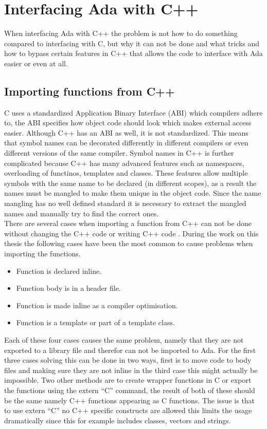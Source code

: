 \chapter{Interfacing Ada with C++}
When interfacing Ada with C++ the problem is not how to do something compared to interfacing with C, but why it can not be done and what tricks and how to bypass certain features in C++ that allows the code to interface with Ada easier or even at all.
\section{Importing functions from C++}
C uses a standardized Application Binary Interface (ABI) which compilers adhere to, the ABI specifies how object code should look which makes external access easier. Although C++ has an ABI as well, it is not standardized. This means that symbol names can be decorated differently in different compilers or even different versions of the same compiler. Symbol names in C++ is further complicated because C++ has many advanced features such as namespaces, overloading of functinos, templates and classes. These features allow multiple symbols with the same name to be declared (in different scopes), as a result the names must be mangled to make them unique in the object code. Since the name mangling has no well defined standard it is necessary to extract the mangled names and manually try to find the correct ones.
\\
There are several cases when importing a function from C++ can not be done without changing the C++ code or writing C++ code \cite{gccinterface}. During the work on this thesis the following cases have been the most common to cause problems when importing the functions.
\begin{itemize}
\item Function is declared inline.
\item Function body is in a header file.
\item Function is made inline as a compiler optimisation.
\item Function is a template or part of a template class.
\end{itemize}
Each of these four cases causes the same problem, namely that they are not exported to a library file and therefor can not be imported to Ada. For the first three cases solving this can be done in two ways, first is to move code to body files and making sure they are not inline in the third case this might actually be impossible. Two other methods are to create wrapper functions in C or export the functions using the extern ``C'' command, the result of both of these should be the same namely C++ functions appearing as C functions. The issue is that to use extern ``C'' no C++ specific constructs are allowed this limits the usage dramatically since this for example includes classes, vectors and strings. 
